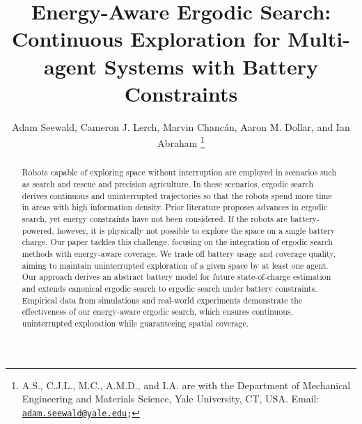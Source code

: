 \documentclass[letterpaper,10pt,conference,twoside]{IEEEtran}
\theoremstyle{definition}
\begin{document}

\title{\LARGE\bf Energy-Aware Ergodic Search: Continuous Exploration for Multi-agent Systems with Battery Constraints}

\author{Adam Seewald, Cameron J. Lerch, Marvin Chanc{\'a}n, Aaron M. Dollar, and Ian Abraham
  \thanks{A.\hspace*{.4ex}S., C.\hspace*{.4ex}J.\hspace*{.4ex}L., M.\hspace*{.4ex}C., A.\hspace*{.4ex}M.\hspace*{.4ex}D., and I.\hspace*{.4ex}A. are with the Department of Mechanical Engineering and Materials Science, Yale University, CT, USA. Email: {\tt\footnotesize \href{mailto:adam.seewald@yale.edu}{adam.seewald@yale.edu};}}
}

\maketitle

\vspace*{-.05cm} 

\begin{abstract} 
  Robots capable of exploring space without interruption are employed in scenarios such as search and rescue and precision agriculture. In these scenarios, ergodic search derives continuous and uninterrupted trajectories so that the robots spend more time in areas with high information density. Prior literature proposes advances in ergodic search, yet energy constraints have not been considered. If the robots are battery-powered, however, it is physically not possible to explore the space on a single battery charge. Our paper tackles this challenge, focusing on the integration of ergodic search methods with energy-aware coverage. We trade off battery usage and coverage quality, aiming to maintain uninterrupted exploration of a given space by at least one agent. Our approach derives an abstract battery model for future state-of-charge estimation and extends canonical ergodic search to ergodic search under battery constraints. Empirical data from simulations and real-world experiments demonstrate the effectiveness of our energy-aware ergodic search, which ensures continuous, uninterrupted exploration while guaranteeing spatial coverage.
\end{abstract}
\end{document}
